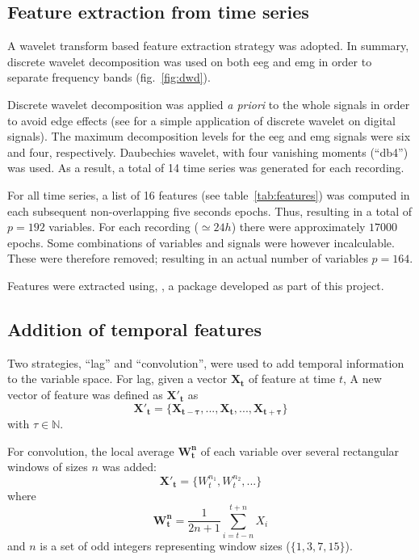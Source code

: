 \subsection{Feature extraction from time series}
\label{sub:features}

A wavelet transform based feature extraction strategy was adopted.
In summary, discrete wavelet decomposition was used on both \gls{eeg} and \gls{emg}
in order to separate frequency bands (fig.~\ref{fig:dwd}).



Discrete wavelet decomposition was applied \emph{a priori} to the whole signals
in order to avoid edge effects (see \cite{prabhakar_application_2002} for a
simple application of discrete wavelet on digital signals).
The maximum decomposition levels for the \gls{eeg} and \gls{emg} signals were six and four, respectively.
Daubechies wavelet, with four vanishing moments (``db4'') was used.
As a result, a total of 14 time series was generated for each recording.

For all time series, a list of 16 features (see table~\ref{tab:features}) was computed in each subsequent non-overlapping five seconds epochs.
Thus, resulting in a total of $p=192$ variables. 
For each recording ($\simeq 24h$) there were approximately $17000$ epochs.
Some combinations of variables and signals were however incalculable.
These were therefore removed; resulting in an actual number of variables $p=164$.



Features were extracted using, \pr{}, a \py{} package developed as part of this project.


\subsection{Addition of temporal features}
Two strategies, ``lag'' and ``convolution'', were used to add temporal
information to the variable space\cite{dietterich_machine_2002}.
For lag, given a vector $\mathbf{X_t}$ of feature at time $t$,
A new vector of feature was defined as $\mathbf{{X'}_t}$ as
\begin{equation}
\mathbf{{X'}_t} = \{\mathbf{X_{t-\tau}}, ..., \mathbf{X_t}, ..., \mathbf{X_{t+\tau}}\}
\label{eq:tau}
\end{equation}
with $\tau \in \mathbb{N}$.

For convolution, the local average $\mathbf{W^n_t}$ of each variable over several rectangular windows of sizes $n$ was added:
\begin{equation}
\mathbf{{X'}_t} = \{W^{n_1}_t, W^{n_2}_t, ...\}
\label{eq:window}
\end{equation}
where
\[
\mathbf{W^n_t} = \frac{1}{2n+1} \sum_{i = t-n}^{t+n}{X_i}
\]
and $n$ is a set of odd integers representing window sizes (\eg $\{1,3,7,15\}$).



